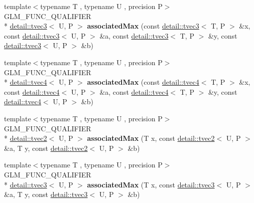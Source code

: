 \begin{DoxyCompactItemize}
\item 
\hypertarget{namespaceglm_ad000be1eb1773a86069dbb63ae0d25b7}{{\footnotesize template$<$typename T , typename U , precision P$>$ }\\G\-L\-M\-\_\-\-F\-U\-N\-C\-\_\-\-Q\-U\-A\-L\-I\-F\-I\-E\-R \\*
\hyperlink{structglm_1_1detail_1_1tvec3}{detail\-::tvec3}$<$ U, P $>$ {\bfseries associated\-Max} (const \hyperlink{structglm_1_1detail_1_1tvec3}{detail\-::tvec3}$<$ T, P $>$ \&x, const \hyperlink{structglm_1_1detail_1_1tvec3}{detail\-::tvec3}$<$ U, P $>$ \&a, const \hyperlink{structglm_1_1detail_1_1tvec3}{detail\-::tvec3}$<$ T, P $>$ \&y, const \hyperlink{structglm_1_1detail_1_1tvec3}{detail\-::tvec3}$<$ U, P $>$ \&b)}\label{namespaceglm_ad000be1eb1773a86069dbb63ae0d25b7}

\item 
\hypertarget{namespaceglm_a520ea02280ceecedc01f2857b27d40e4}{{\footnotesize template$<$typename T , typename U , precision P$>$ }\\G\-L\-M\-\_\-\-F\-U\-N\-C\-\_\-\-Q\-U\-A\-L\-I\-F\-I\-E\-R \\*
\hyperlink{structglm_1_1detail_1_1tvec4}{detail\-::tvec4}$<$ U, P $>$ {\bfseries associated\-Max} (const \hyperlink{structglm_1_1detail_1_1tvec4}{detail\-::tvec4}$<$ T, P $>$ \&x, const \hyperlink{structglm_1_1detail_1_1tvec4}{detail\-::tvec4}$<$ U, P $>$ \&a, const \hyperlink{structglm_1_1detail_1_1tvec4}{detail\-::tvec4}$<$ T, P $>$ \&y, const \hyperlink{structglm_1_1detail_1_1tvec4}{detail\-::tvec4}$<$ U, P $>$ \&b)}\label{namespaceglm_a520ea02280ceecedc01f2857b27d40e4}

\item 
\hypertarget{namespaceglm_ac87c6da2e1f2cb4e841aa62635dc0166}{{\footnotesize template$<$typename T , typename U , precision P$>$ }\\G\-L\-M\-\_\-\-F\-U\-N\-C\-\_\-\-Q\-U\-A\-L\-I\-F\-I\-E\-R \\*
\hyperlink{structglm_1_1detail_1_1tvec2}{detail\-::tvec2}$<$ U, P $>$ {\bfseries associated\-Max} (T x, const \hyperlink{structglm_1_1detail_1_1tvec2}{detail\-::tvec2}$<$ U, P $>$ \&a, T y, const \hyperlink{structglm_1_1detail_1_1tvec2}{detail\-::tvec2}$<$ U, P $>$ \&b)}\label{namespaceglm_ac87c6da2e1f2cb4e841aa62635dc0166}

\item 
\hypertarget{namespaceglm_ad605ba2f1c07e4c422cdeb3aacfcaf2e}{{\footnotesize template$<$typename T , typename U , precision P$>$ }\\G\-L\-M\-\_\-\-F\-U\-N\-C\-\_\-\-Q\-U\-A\-L\-I\-F\-I\-E\-R \\*
\hyperlink{structglm_1_1detail_1_1tvec3}{detail\-::tvec3}$<$ U, P $>$ {\bfseries associated\-Max} (T x, const \hyperlink{structglm_1_1detail_1_1tvec3}{detail\-::tvec3}$<$ U, P $>$ \&a, T y, const \hyperlink{structglm_1_1detail_1_1tvec3}{detail\-::tvec3}$<$ U, P $>$ \&b)}\label{namespaceglm_ad605ba2f1c07e4c422cdeb3aacfcaf2e}


\end{DoxyCompactItemize}
